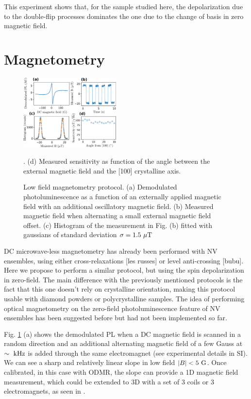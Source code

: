 \documentclass[preprintnumbers,amsmath,amssymb,superscriptaddress,twocolumn,showpacs]{revtex4-2}
\begin{document}
This experiment shows that, for the sample studied here, the depolarization due to the double-flip processes dominates the one due to the change of basis in zero magnetic field.

\section*{Magnetometry}
\begin{figure}
\includegraphics[width=0.45\textwidth]{Figures/fig_magneto}
\caption{Low field magnetometry protocol. (a) Demodulated photoluminescence as a function of an externally applied magnetic field with an additional oscillatory magnetic field. (b) Measured magnetic field when alternating a small external magnetic field offset. (c) Histogram of the measurement in Fig. (b) fitted with gaussians of standard deviation $\sigma=1.5\ \mu \rm T$}. (d) Measured sensitivity as function of the angle between the external magnetic field and the [100] crystalline axis.
\label{magneto}
\end{figure}
%
DC microwave-less magnetometry has already been performed with NV ensembles, using either cross-relaxations [les russes] or level anti-crossing [bubu]. Here we propose to perform a similar protocol, but using the spin depolarization in zero-field. The main difference with the previously mentioned protocols is the fact that this one doesn't rely on crystalline orientation, making this protocol usable with diamond powders or polycrystalline samples. The idea of performing optical magnetometry on the zero-field photoluminescence feature of NV ensembles has been suggested before \cite{filimonenko2018weak, filimonenko2022manifestation} but had not been implemented so far.

Fig. \ref{magneto} (a) shows the demodulated PL when a DC magnetic field is scanned in a random direction and an additional alternating magnetic field of a few Gauss at $\sim \ \rm kHz$ is added through the same electromagnet (see experimental details in SI). We can see a sharp and relatively linear slope in low field $\abs{B} < 5\ \rm G$. Once calibrated, in this case with ODMR, the slope can provide a 1D magnetic field measurement, which could be extended to 3D with a set of 3 coils or 3 electromagnets, as seen in \cite{zheng_microwave-free_2020}.
\end{document}
